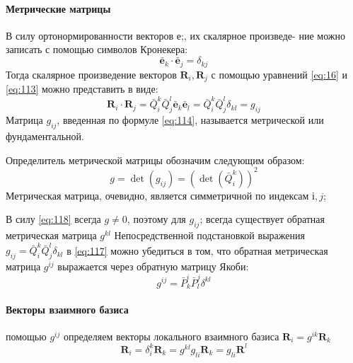 \paragraph{Метрические матрицы}
В силу ортонормированности векторов е;, их скалярное произведе- ние можно записать с помощью символов Кронекера:
\begin{equation}
\label{eq:113}
    \bar{\textbf{e}}_k \cdot \bar{\textbf{e}}_j = \delta_{kj}
\end{equation}
Тогда скалярное произведение векторов $\textbf{R}_i, \textbf{R}_j$ с помощью уравнений \eqref{eq:16} и \eqref{eq:113}  можно представить в виде:
\begin{equation}
\label{eq:114}
    \textbf{R}_i\cdot \textbf{R}_j = 
    \bar{Q}^k_i \bar{Q}^l_j \bar{\textbf{e}}_k \bar{\textbf{e}}_l =
    \bar{Q}^k_i \bar{Q}^l_j \delta_{kl} =
    g_{ij}
\end{equation}
 Матрица $g_{ij}$, введенная по формуле \eqref{eq:114}, называется
метрической или фундаментальной.

Определитель метрической матрицы обозначим следующим образом:
\begin{equation}
\label{eq:115}
    g = \det(g_{ij}) = (\det(\bar{Q}^k_i))^2
\end{equation}
Метрическая матрица, очевидно, является симметричной по индексам $і,j$;

В силу \eqref{eq:118} всегда $g \ne 0$, поэтому для $g_{ij}$; всегда существует обратная метрическая матрица $g^{kl}$
Непосредственной подстановкой выражения $g_{ij} = \bar{Q}^k_i \bar{Q}^l_j \delta_{kl}$ в \eqref{eq:117}  можно убедиться в том, что обратная метрическая матрица $g^{ij}$ выражается через обратную матрицу Якоби:
\begin{equation}
\label{eq:118}
    g^{ij} = \bar{P}^i_k \bar{P}^j_l \delta^{kl}
\end{equation}
\paragraph{Векторы взаимного базиса}
 помощью $g^{ij}$ определяем векторы локального взаимного базиса $\textbf{R}_i =g^{ik}\textbf{R}_k$
\begin{equation}
\label{eq:119}
    \textbf{R}_i = \delta^k_i\textbf{R}_k =
    g^{kl}g_{li}\textbf{R}_k = g_{li}\textbf{R}^l
\end{equation}